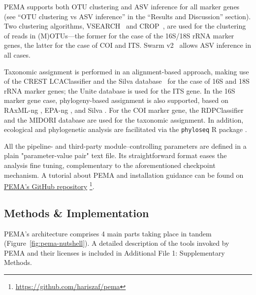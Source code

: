    PEMA supports both OTU clustering and ASV inference for all marker genes 
   (see “OTU clustering vs ASV inference” in the “Results and Discussion” section). 
   Two clustering algorithms, VSEARCH~\cite{rognes2016vsearch} and CROP~\cite{hao2011clustering}, are used for the clustering of reads in (M)OTUs—the former for the case of the 16S/18S rRNA marker genes, the latter for the case of COI and ITS. 
   Swarm v2~\cite{mahe2015swarm} allows ASV inference in all cases.
   
   Taxonomic assignment is performed in an alignment-based approach, making use of the CREST LCAClassifier \cite{lanzen2012crest} and the Silva database~\cite{quast2012silva} for the case of 16S and 18S rRNA marker genes; 
   the Unite database \cite{rillig2019role} is used for the ITS gene. 
   In the 16S marker gene case, phylogeny-based assignment is also supported, based on RAxML-ng \cite{kozlov2019raxml}, 
   EPA-ng \cite{barbera2019epa}, and Silva \cite{quast2012silva}. 
   For the COI marker gene, the RDPClassifier \cite{wang2007naive} and the MIDORI database \cite{machida2017metazoan} are used for the taxonomic assignment. 
   In addition, ecological and phylogenetic analysis are facilitated via the \texttt{phyloseq} R package \cite{mcmurdie2013phyloseq}.
   
   All the pipeline- and third-party module–controlling parameters are defined in a plain "parameter-value pair" text file. Its straightforward format eases the analysis fine tuning, complementary to the aforementioned checkpoint mechanism. A tutorial about PEMA and installation guidance can be found on \href{https://github.com/hariszaf/pema}{PEMA's GitHub repository} 
   \footnote{
      \href{https://github.com/hariszaf/pema}{https://github.com/hariszaf/pema}
   }.


   \subsection{Methods \& Implementation}

   PEMA's architecture comprises 4 main parts taking place in tandem (Figure~\ref{fig:pema-nutshell}). A detailed description of the tools invoked by PEMA and their licenses is included in Additional File 1: Supplementary Methods.

